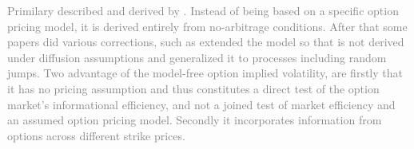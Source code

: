 \textcolor{gray}{
Primilary described and derived by \citeauthor{britten2000}. Instead of being based on a specific option pricing model, it is derived entirely from no-arbitrage conditions. After that some papers did various corrections, such as \citeauthor{jiang2003} extended the model so that is not derived under diffusion assumptions and generalized it to processes including random jumps. Two advantage of the model-free option implied volatility, are firstly that it has no pricing assumption and thus constitutes a direct test of the option market's informational efficiency, and not a joined test of market efficiency and an assumed option pricing model. Secondly it incorporates information from options across different strike prices. }
